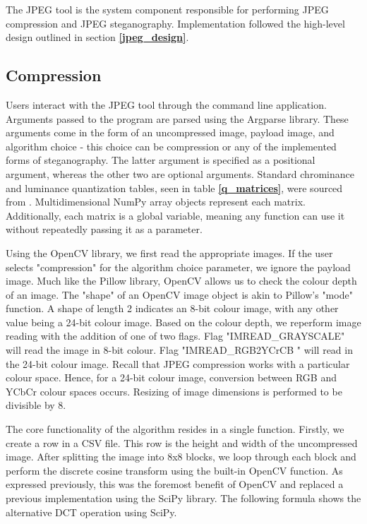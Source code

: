 \documentclass{l4proj}
\begin{document}
The JPEG tool is the system component responsible for performing JPEG compression and JPEG steganography. Implementation followed the high-level design outlined in section \textbf{\ref{jpeg_design}}. 

\subsection{Compression}

Users interact with the JPEG tool through the command line application. Arguments passed to the program are parsed using the Argparse library. These arguments come in the form of an uncompressed image, payload image, and algorithm choice - this choice can be compression or any of the implemented forms of steganography. The latter argument is specified as a positional argument, whereas the other two are optional arguments. Standard chrominance and luminance quantization tables, seen in table \textbf{\ref{q_matrices}}, were sourced from \citet{attaby_2021}. Multidimensional NumPy array objects represent each matrix. Additionally, each matrix is a global variable, meaning any function can use it without repeatedly passing it as a parameter.

Using the OpenCV library, we first read the appropriate images. If the user selects "compression" for the algorithm choice parameter, we ignore the payload image. Much like the Pillow library, OpenCV allows us to check the colour depth of an image. The "shape" of an OpenCV image object is akin to Pillow's "mode" function. A shape of length 2 indicates an 8-bit colour image, with any other value being a 24-bit colour image. Based on the colour depth, we reperform image reading with the addition of one of two flags. Flag "IMREAD\_GRAYSCALE" will read the image in 8-bit colour. Flag "IMREAD\_RGB2YCrCB " will read in the 24-bit colour image. Recall that JPEG compression works with a particular colour space. Hence, for a 24-bit colour image, conversion between RGB and YCbCr colour spaces occurs. Resizing of image dimensions is performed to be divisible by 8. 

The core functionality of the algorithm resides in a single function. Firstly, we create a row in a CSV file. This row is the height and width of the uncompressed image. After splitting the image into 8x8 blocks, we loop through each block and perform the discrete cosine transform using the built-in OpenCV function. As expressed previously, this was the foremost benefit of OpenCV and replaced a previous implementation using the SciPy library. The following formula shows the alternative DCT operation using SciPy.
\end{document}
